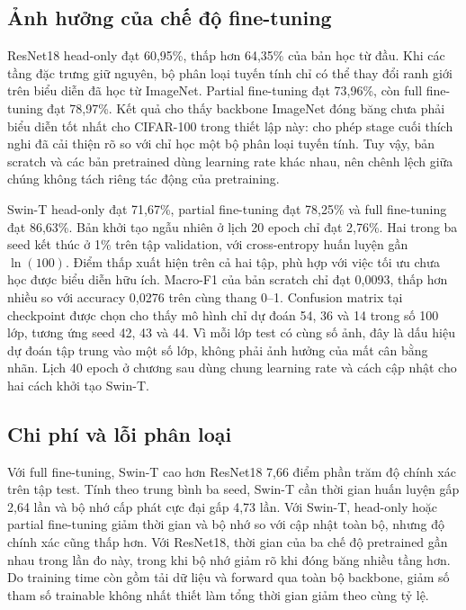 \subsection{Ảnh hưởng của chế độ fine-tuning}

ResNet18 head-only đạt 60,95\%, thấp hơn 64,35\% của bản học từ đầu. Khi các tầng đặc trưng giữ nguyên, bộ phân loại tuyến tính chỉ có thể thay đổi ranh giới trên biểu diễn đã học từ ImageNet. Partial fine-tuning đạt 73,96\%, còn full fine-tuning đạt 78,97\%. Kết quả cho thấy backbone ImageNet đóng băng chưa phải biểu diễn tốt nhất cho CIFAR-100 trong thiết lập này: cho phép stage cuối thích nghi đã cải thiện rõ so với chỉ học một bộ phân loại tuyến tính. Tuy vậy, bản scratch và các bản pretrained dùng learning rate khác nhau, nên chênh lệch giữa chúng không tách riêng tác động của pretraining.

Swin-T head-only đạt 71,67\%, partial fine-tuning đạt 78,25\% và full fine-tuning đạt 86,63\%. Bản khởi tạo ngẫu nhiên ở lịch 20 epoch chỉ đạt 2,76\%. Hai trong ba seed kết thúc ở 1\% trên tập validation, với cross-entropy huấn luyện gần $\ln(100)$. Điểm thấp xuất hiện trên cả hai tập, phù hợp với việc tối ưu chưa học được biểu diễn hữu ích. Macro-F1 của bản scratch chỉ đạt 0,0093, thấp hơn nhiều so với accuracy 0,0276 trên cùng thang 0--1. Confusion matrix tại checkpoint được chọn cho thấy mô hình chỉ dự đoán 54, 36 và 14 trong số 100 lớp, tương ứng seed 42, 43 và 44. Vì mỗi lớp test có cùng số ảnh, đây là dấu hiệu dự đoán tập trung vào một số lớp, không phải ảnh hưởng của mất cân bằng nhãn. Lịch 40 epoch ở chương sau dùng chung learning rate và cách cập nhật cho hai cách khởi tạo Swin-T.

\subsection{Chi phí và lỗi phân loại}

Với full fine-tuning, Swin-T cao hơn ResNet18 7,66 điểm phần trăm độ chính xác trên tập test. Tính theo trung bình ba seed, Swin-T cần thời gian huấn luyện gấp 2,64 lần và bộ nhớ cấp phát cực đại gấp 4,73 lần. Với Swin-T, head-only hoặc partial fine-tuning giảm thời gian và bộ nhớ so với cập nhật toàn bộ, nhưng độ chính xác cũng thấp hơn. Với ResNet18, thời gian của ba chế độ pretrained gần nhau trong lần đo này, trong khi bộ nhớ giảm rõ khi đóng băng nhiều tầng hơn. Do training time còn gồm tải dữ liệu và forward qua toàn bộ backbone, giảm số tham số trainable không nhất thiết làm tổng thời gian giảm theo cùng tỷ lệ.

